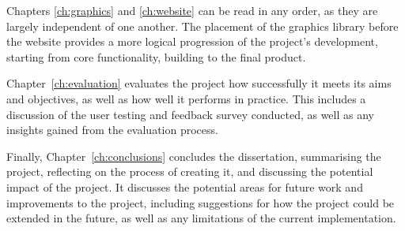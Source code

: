 \documentclass[../main.tex]{subfiles}
\begin{document}
        Chapters \ref{ch:graphics} and \ref{ch:website} can be read in any order, as
            they are largely independent of one another.
        The placement of the graphics library before the website provides a more
            logical progression of the project's development, starting from core
            functionality, building to the final product.

        Chapter~\ref{ch:evaluation} evaluates the project how successfully it meets its
            aims and objectives, as well as how well it performs in practice.
        This includes a discussion of the user testing and feedback survey conducted,
            as well as any insights gained from the evaluation process.

        Finally, Chapter~\ref{ch:conclusions} concludes the dissertation, summarising
            the project, reflecting on the process of creating it, and discussing the
            potential impact of the project.
        It discusses the potential areas for future work and improvements to the
            project, including suggestions for how the project could be extended in the
            future, as well as any limitations of the current implementation.
\end{document}
